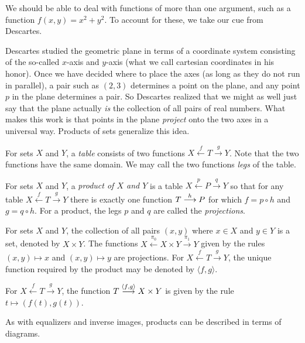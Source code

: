 We should be able to deal with functions of more than one argument, such as a function $f(x,y) = x^2+y^2$.
To account for these, we take our cue from Descartes.

Descartes studied the geometric plane in terms of a coordinate system consisting of the so-called $x$-axis and $y$-axis (what we call cartesian coordinates in his honor).
Once we have decided where to place the axes (as long as they do not run in parallel), a pair such as $(2,3)$ determines a point on the plane, and any point $p$ in the plane determines a pair.
So Descartes realized that we might as well just say that the plane actually \emph{is} the collection of all pairs of real numbers.
What makes this work is that points in the plane \emph{project} onto the two axes in a universal way.
Products of sets generalize this idea.

\begin{defn}
For sets $X$ and $Y$, a \emph{table} consists of two functions $X\stackrel{f}{\longleftarrow} T\stackrel{g}{\longrightarrow}Y$.
Note that the two functions have the same domain. We may call the two functions \emph{legs} of the table.

For sets $X$ and $Y$, a \emph{product of $X$ and $Y$} is a table $X\stackrel{p}{\longleftarrow} P\stackrel{q}{\longrightarrow}Y$ so that for any table $X\stackrel{f}{\longleftarrow} T\stackrel{g}{\longrightarrow}Y$ there is exactly one function $\sfromto hTP$ for which $f = p\circ h$ and $g= q\circ h$. 
For a product, the legs $p$ and $q$ are called the \emph{projections}.
\end{defn}

\begin{principle}\label{ax:products}
	For sets $X$ and $Y$, the collection of all pairs $(x,y)$ where $x\in X$ and $y\in Y$ is a set, denoted by $X\times Y$. 
	The functions $X\stackrel{\pi_0}{\longleftarrow}{X\times Y}\stackrel{\pi_1}{\longrightarrow}Y$ given by the rules $(x,y)\mapsto x$
	and $(x,y)\mapsto y$ are projections. For $X\stackrel{f}{\longleftarrow}{T}\stackrel{g}{\longrightarrow}Y$, the unique function required by
	the product may be denoted by $\langle f,g\rangle$.

	For $X\stackrel{f}{\longleftarrow}{T}\stackrel{g}{\longrightarrow}Y$, the function $\sfromto {\langle f,g\rangle}T{X\times Y}$ is given by the rule $t\mapsto(f(t),g(t))$.
\end{principle}

As with equalizers and inverse images, products can be described in terms of diagrams.

